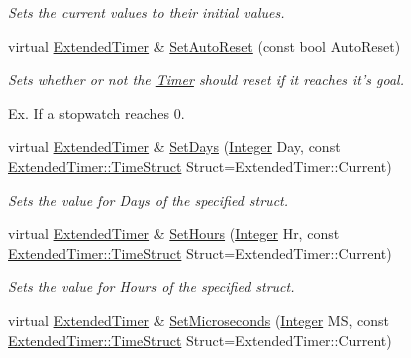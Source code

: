 \begin{DoxyCompactItemize}
\begin{DoxyCompactList}\small\item\em Sets the current values to their initial values. \item\end{DoxyCompactList}\item 
virtual \hyperlink{classphys_1_1ExtendedTimer}{ExtendedTimer} \& \hyperlink{classphys_1_1ExtendedTimer_aa16dfa7e855f9b8b55c85058cb24d03a}{SetAutoReset} (const bool AutoReset)
\begin{DoxyCompactList}\small\item\em Sets whether or not the \hyperlink{classphys_1_1Timer}{Timer} should reset if it reaches it's goal. \par
 Ex. If a stopwatch reaches 0. \item\end{DoxyCompactList}\item 
virtual \hyperlink{classphys_1_1ExtendedTimer}{ExtendedTimer} \& \hyperlink{classphys_1_1ExtendedTimer_a3aeeb90ac4e4b20a59b29fc1ee738141}{SetDays} (\hyperlink{namespacephys_a7f09bf5585b2bb97613cd9aad4273a81}{Integer} Day, const \hyperlink{classphys_1_1ExtendedTimer_a0f316e9347d1c118a157cc3c737c554b}{ExtendedTimer::TimeStruct} Struct=ExtendedTimer::Current)
\begin{DoxyCompactList}\small\item\em Sets the value for Days of the specified struct. \item\end{DoxyCompactList}\item 
virtual \hyperlink{classphys_1_1ExtendedTimer}{ExtendedTimer} \& \hyperlink{classphys_1_1ExtendedTimer_a33f3d02bdf07073dc4fdf979dd3f68bc}{SetHours} (\hyperlink{namespacephys_a7f09bf5585b2bb97613cd9aad4273a81}{Integer} Hr, const \hyperlink{classphys_1_1ExtendedTimer_a0f316e9347d1c118a157cc3c737c554b}{ExtendedTimer::TimeStruct} Struct=ExtendedTimer::Current)
\begin{DoxyCompactList}\small\item\em Sets the value for Hours of the specified struct. \item\end{DoxyCompactList}\item 
virtual \hyperlink{classphys_1_1ExtendedTimer}{ExtendedTimer} \& \hyperlink{classphys_1_1ExtendedTimer_a86f1e5d470565a2dda78b66aca47d667}{SetMicroseconds} (\hyperlink{namespacephys_a7f09bf5585b2bb97613cd9aad4273a81}{Integer} MS, const \hyperlink{classphys_1_1ExtendedTimer_a0f316e9347d1c118a157cc3c737c554b}{ExtendedTimer::TimeStruct} Struct=ExtendedTimer::Current)

\end{DoxyCompactItemize}
